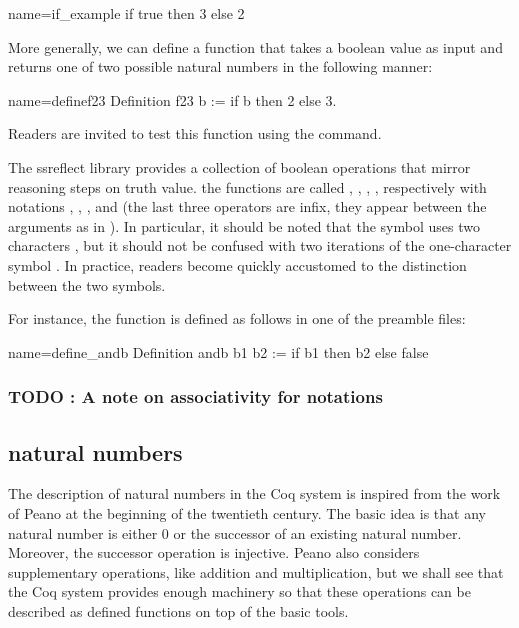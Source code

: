 \begin{coq}{name=if_example}{}
 if true then 3 else 2
\end{coq}
More generally, we can define a function that takes a boolean value as
input and returns one of two possible natural numbers in the following
manner:

\begin{coq}{name=definef23}{}
Definition f23 b := if b then 2 else 3.
\end{coq}
Readers are invited to test this function using the  command.

The ssreflect library provides a collection of boolean operations that
mirror reasoning steps on truth value.  the functions are called
, ,  , , respectively with notations
\C{\~\~},  \C{||}, \C{&&}, and \C{==>} (the last three operators are
infix, they appear between the arguments as in ).
  In
particular, it should be
noted that the symbol \C{\~\~} uses two characters \C{\~}, but it should
not be confused with two iterations of the one-character symbol
\C{\~}.  In practice, readers become quickly accustomed to the
distinction between the two symbols.

For instance, the function  is defined as follows in one of
the preamble files:

\begin{coq}{name=define_andb}{}
Definition andb b1 b2 := if b1 then b2 else false
\end{coq}

\subsubsection{TODO : A note on associativity for notations}

\subsection{natural numbers}
The description of natural numbers in the Coq system is inspired from
the work of Peano at the beginning of the twentieth century.  The
basic idea is that any natural number is either 0 or the successor of
an existing natural number.  Moreover, the successor operation is
injective.  Peano also considers supplementary operations, like
addition and multiplication, but we shall see that the Coq system
provides enough machinery so that these operations can be described as
defined functions on top of the basic tools.

